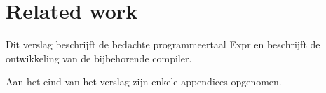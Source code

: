 \chapter{Related work}
Dit verslag beschrijft de bedachte programmeertaal Expr en beschrijft de
ontwikkeling van de bijbehorende compiler.

Aan het eind van het verslag zijn enkele appendices opgenomen.
